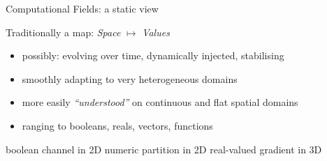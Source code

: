\documentclass[presentation, 9pt]{beamer}\mode<presentation>{\usetheme{AMSBolognaFC}}
\begin{document}
\begin{frame}[fragile]{Computational Fields: a static view}
	\begin{alertblock}{Traditionally a map: \textit{Space} $\mapsto$ \textit{Values}}
		\begin{itemize}
			\item possibly: evolving over time, dynamically injected, stabilising
			\item smoothly adapting to very heterogeneous domains
			\item more easily \emph{``understood''} on continuous and flat spatial domains
			\item ranging to booleans, reals, vectors, functions
		\end{itemize}
	\end{alertblock}
	\vfill
	\begin{multicols}{3}
		{ boolean channel in 2D}
		{ numeric partition in 2D}
		{ real-valued gradient in 3D}
	\end{multicols}
\end{frame}
\end{document}
